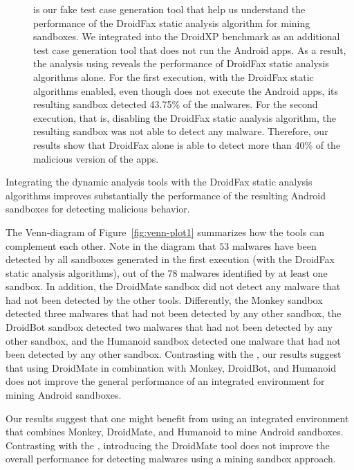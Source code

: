 \begin{description}
    
  \item[\joke] is our fake test case generation tool that help us understand the performance of the DroidFax static analysis algorithm for mining sandboxes. 
    We integrated \joke into the DroidXP benchmark as an additional test case generation tool that does not run the Android apps.
    As a result, the analysis using \joke reveals the performance of DroidFax static analysis algorithms alone. For the first execution, with the DroidFax static
    algorithms enabled, even though \joke does not execute the Android apps, its resulting sandbox detected 43.75\% of the malwares. For the second execution,
    that is, disabling the DroidFax static analysis algorithm, the resulting \joke sandbox was not able to detect any malware. Therefore,
    our results show that DroidFax alone is able to detect more than 40\% of the malicious version of the apps. 

\end{description}


\begin{finding}
  Integrating the dynamic analysis tools
  with the DroidFax static analysis algorithms
  improves substantially the performance
  of the resulting Android sandboxes for
  detecting malicious behavior. 
\end{finding}
 
The Venn-diagram of Figure~\ref{fig:venn-plot1}
summarizes how the tools can complement each other.
Note in the diagram that $53$ malwares have been detected
by all sandboxes generated in the first execution (with the DroidFax static analysis algorithms),
out of the 78 malwares identified by at least one sandbox. In addition, the DroidMate sandbox did not detect
any malware that had not been detected by the other tools. Differently, the Monkey sandbox detected
three malwares that had not been detected by any other sandbox, the DroidBot sandbox detected two malwares
that had not been detected by any other sandbox, and the Humanoid sandbox detected one malware that had not
been detected by any other sandbox. 
Contrasting with the \blls,
our results suggest that using DroidMate in combination with Monkey, DroidBot, and Humanoid
does not improve the general performance of an integrated environment for mining
Android sandboxes.

\begin{finding}
  Our results suggest that one might benefit from using  an integrated
  environment that combines Monkey, DroidMate, and Humanoid to
  mine Android sandboxes. Contrasting with the \blls, introducing the DroidMate 
  tool does not improve the overall performance for detecting malwares using
  a mining sandbox approach.
\end{finding}


